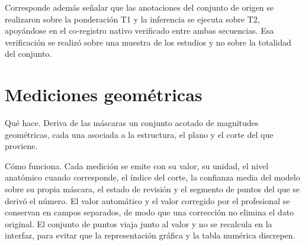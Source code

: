 Corresponde además señalar que las anotaciones del conjunto de origen se realizaron sobre la ponderación T1 y la inferencia se ejecuta sobre T2, apoyándose en el co-registro nativo verificado entre ambas secuencias. Esa verificación se realizó sobre una muestra de los estudios y no sobre la totalidad del conjunto.

\section{Mediciones geométricas}

Qué hace. Deriva de las máscaras un conjunto acotado de magnitudes geométricas, cada una asociada a la estructura, el plano y el corte del que proviene.

Cómo funciona. Cada medición se emite con su valor, su unidad, el nivel anatómico cuando corresponde, el índice del corte, la confianza media del modelo sobre su propia máscara, el estado de revisión y el segmento de puntos del que se derivó el número. El valor automático y el valor corregido por el profesional se conservan en campos separados, de modo que una corrección no elimina el dato original. El conjunto de puntos viaja junto al valor y no se recalcula en la interfaz, para evitar que la representación gráfica y la tabla numérica discrepen.

